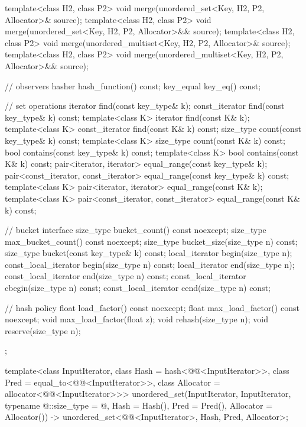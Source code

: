 \begin{codeblock}
{{    template<class H2, class P2>
      void merge(unordered_set<Key, H2, P2, Allocator>& source);
    template<class H2, class P2>
      void merge(unordered_set<Key, H2, P2, Allocator>&& source);
    template<class H2, class P2>
      void merge(unordered_multiset<Key, H2, P2, Allocator>& source);
    template<class H2, class P2>
      void merge(unordered_multiset<Key, H2, P2, Allocator>&& source);

    // observers
    hasher hash_function() const;
    key_equal key_eq() const;

    // set operations
    iterator         find(const key_type& k);
    const_iterator   find(const key_type& k) const;
    template<class K>
      iterator       find(const K& k);
    template<class K>
      const_iterator find(const K& k) const;
    size_type        count(const key_type& k) const;
    template<class K>
      size_type      count(const K& k) const;
    bool             contains(const key_type& k) const;
    template<class K>
      bool           contains(const K& k) const;
    pair<iterator, iterator>               equal_range(const key_type& k);
    pair<const_iterator, const_iterator>   equal_range(const key_type& k) const;
    template<class K>
      pair<iterator, iterator>             equal_range(const K& k);
    template<class K>
      pair<const_iterator, const_iterator> equal_range(const K& k) const;

    // bucket interface
    size_type bucket_count() const noexcept;
    size_type max_bucket_count() const noexcept;
    size_type bucket_size(size_type n) const;
    size_type bucket(const key_type& k) const;
    local_iterator begin(size_type n);
    const_local_iterator begin(size_type n) const;
    local_iterator end(size_type n);
    const_local_iterator end(size_type n) const;
    const_local_iterator cbegin(size_type n) const;
    const_local_iterator cend(size_type n) const;

    // hash policy
    float load_factor() const noexcept;
    float max_load_factor() const noexcept;
    void max_load_factor(float z);
    void rehash(size_type n);
    void reserve(size_type n);
  };

  template<class InputIterator,
           class Hash = hash<@@<InputIterator>>,
           class Pred = equal_to<@@<InputIterator>>,
           class Allocator = allocator<@@<InputIterator>>>
    unordered_set(InputIterator, InputIterator, typename @\seebelow@::size_type = @\seebelow@,
                  Hash = Hash(), Pred = Pred(), Allocator = Allocator())
      -> unordered_set<@@<InputIterator>,
                       Hash, Pred, Allocator>;

}
\end{codeblock}

